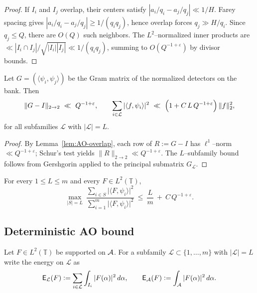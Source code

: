 \begin{proof}
If $I_i$ and $I_j$ overlap, their centers satisfy $|a_i/q_i-a_j/q_j|\ll 1/H$. Farey spacing gives $|a_i/q_i-a_j/q_j|\ge 1/(q_iq_j)$, hence overlap forces $q_j\gg H/q_i$. Since $q_j\le Q$, there are $O(Q)$ such neighbors. The $L^2$–normalized inner products are $\ll |I_i\cap I_j|/\sqrt{|I_i||I_j|}\ll 1/(q_iq_j)$, summing to $O(Q^{-1+\varepsilon})$ by divisor bounds.
\end{proof}

\begin{theorem}\label{thm:AO-dispersion}
Let $G=(\langle\psi_i,\psi_j\rangle)$ be the Gram matrix of the normalized detectors on the bank. Then
\[
\|G-I\|_{2\to2}\ \ll\ Q^{-1+\varepsilon},
\qquad
\sum_{i\in\mathcal L} |\langle f,\psi_i\rangle|^2\ \ll\ \Bigl(1+C\,L\,Q^{-1+\varepsilon}\Bigr)\,\|f\|_2^2,
\]
for all subfamilies $\mathcal L$ with $|\mathcal L|=L$.
\end{theorem}

\begin{proof}
By Lemma~\ref{lem:AO-overlap}, each row of $R:=G-I$ has $\ell^1$–norm $\ll Q^{-1+\varepsilon}$; Schur’s test yields $\|R\|_{2\to2}\ll Q^{-1+\varepsilon}$. The $L$–subfamily bound follows from Gershgorin applied to the principal submatrix $G_{\mathcal L}$.
\end{proof}


\begin{corollary}\label{cor:AO-occupancy}
For every $1\le L\le m$ and every $F\in L^2(\mathbb T)$,
\[
\max_{|S|=L}\ \frac{\sum_{i\in S}\big|\langle F,\psi_i\rangle\big|^2}{\sum_{i=1}^{m}\big|\langle F,\psi_i\rangle\big|^2}
\ \le\ \frac{L}{m}\ +\ C\,Q^{-1+\varepsilon}.
\]
\end{corollary}

\subsection{Deterministic AO bound}
Let $F\in L^2(\mathbb T)$ be supported on $\mathcal{A}$. For a subfamily $\mathcal L\subset\{1,\dots,m\}$ with $|\mathcal L|=L$ write the energy on $\mathcal L$ as
\[
\mathsf E_{\mathcal L}(F):=\sum_{i\in\mathcal L}\int_{I_i} |F(\alpha)|^2\,d\alpha,\qquad 
\mathsf E_{\mathcal{A}}(F):=\int_{\mathcal{A}} |F(\alpha)|^2\,d\alpha.
\]

